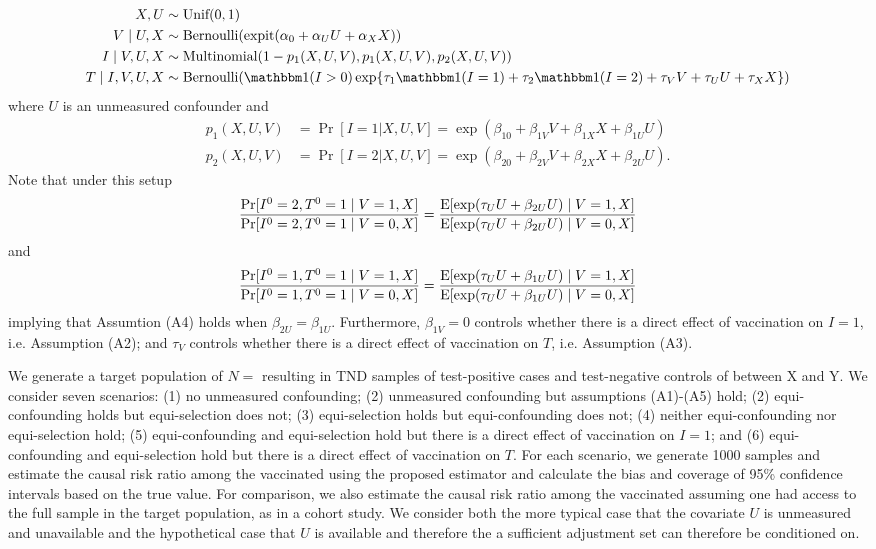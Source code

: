 \documentclass[11pt]{article}
\begin{document}
\begin{align*}
    X, U &\sim \text{Unif}(0,1)\\
    V\mid U, X & \sim \text{Bernoulli}(\expit(\alpha_0 + \alpha_U U + \alpha_X X))\\
    I \mid V, U, X &\sim \text{Multinomial}(1-p_1(X, U, V), p_1(X, U, V), p_2(X, U, V))\\
    T\mid I, V,  U, X &\sim \text{Bernoulli}(\mathbbm 1(I>0)\exp\{\tau_{1}\mathbbm 1(I=1) + \tau_{2}\mathbbm 1(I=2)+\tau_V V + \tau_U U + \tau_X X\})
\end{align*}
where $U$ is an unmeasured confounder and
    \begin{align*}
        p_1(X,U,V) & = \Pr[I = 1 | X, U, V] = \exp(\beta_{10} + \beta_{1V}V + \beta_{1X}X + \beta_{1U}U) \\
        p_2(X,U,V) & = \Pr[I = 2 | X, U, V] = \exp(\beta_{20} + \beta_{2V}V + \beta_{2X}X + \beta_{2U}U).
    \end{align*}
Note that under this setup 
\begin{align*}
    \dfrac{\Pr[I^0=2, T^0=1 \mid V=1,X]}{\Pr[I^0=2, T^0=1\mid V=0,X]}=\dfrac{\operatorname{E}[\exp(\tau_U U+\beta_{2U}U)\mid V=1, X]}{\operatorname{E}[\exp(\tau_U U+\beta_{2U}U)\mid V=0, X]}
\end{align*}
and 
\begin{align*}
    \dfrac{\Pr[I^0=1, T^0=1 \mid V=1,X]}{\Pr[I^0=1, T^0=1\mid V=0,X]}=\dfrac{\operatorname{E}[\exp(\tau_U U+\beta_{1U}U)\mid V=1, X]}{\operatorname{E}[\exp(\tau_U U+\beta_{1U}U)\mid V=0, X]}
\end{align*}
implying that Assumtion (A4) holds when $\beta_{2U}=\beta_{1U}$. Furthermore, $\beta_{1V}=0$ controls whether there is a direct effect of vaccination on $I = 1$, i.e. Assumption (A2); and $\tau_V$ controls whether there is a direct effect of vaccination on $T$, i.e. Assumption (A3).

We generate a target population of $N = $ resulting in TND samples of test-positive cases and test-negative controls of between X and Y. We consider seven scenarios: (1) no unmeasured confounding; (2) unmeasured confounding but assumptions (A1)-(A5) hold; (2) equi-confounding holds but equi-selection does not; (3) equi-selection holds but equi-confounding does not; (4) neither equi-confounding nor equi-selection hold; (5) equi-confounding and equi-selection hold but there is a direct effect of vaccination on $I = 1$; and (6) equi-confounding and equi-selection hold but there is a direct effect of vaccination on $T$. For each scenario, we generate 1000 samples and estimate the causal risk ratio among the vaccinated using the proposed estimator and calculate the bias and coverage of 95\% confidence intervals based on the true value. For comparison, we also estimate the causal risk ratio among the vaccinated assuming one had access to the full sample in the target population, as in a cohort study. We consider both the more typical case that the covariate $U$ is unmeasured and unavailable and the hypothetical case that $U$ is available and therefore the a sufficient adjustment set can therefore be conditioned on. 
\end{document}
